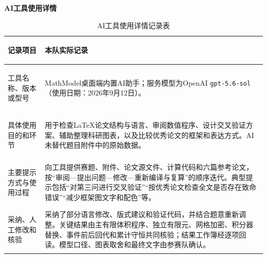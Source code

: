 \documentclass[12pt,a4paper]{ctexart}
\begin{document}
\begin{center}
	{\bfseries AI工具使用详情}
\end{center}

\begin{table}[htbp]
	\centering
	\caption{AI工具使用详情记录表}
	\begin{tabularx}{\textwidth}{>{\bfseries\raggedright\arraybackslash}p{3.6cm}>{\raggedright\arraybackslash}X}
		\toprule
		记录项目 & 本队实际记录 \\
		\midrule
		工具名称、版本或型号 & MathModel桌面端内置AI助手；服务模型为OpenAI \texttt{gpt-5.6-sol}（使用日期：2026年9月12日）。 \\
		具体使用目的和环节 & 用于检查LaTeX论文结构与语言、审阅数值程序、设计交叉验证方案、辅助整理科研图表，以及比较优秀论文的框架和表达方式。AI未替代题目附件中的原始数据。 \\
		主要提示方式与使用过程 & 向工具提供赛题、附件、论文源文件、计算代码和六篇参考论文，按“审阅---提出问题---修改---重新编译与复算”的顺序迭代。典型提示包括“对第三问进行交叉验证”“按优秀论文检查全文是否存在致命错误”“减少框架图文字和配色”等。 \\
		采纳、人工修改和核验 & 采纳了部分语言修改、版式建议和验证代码，并结合题意重新调整。关键结果由主有限体积程序、独立有限元、网格加密、积分器替换、事件前后回代和累计守恒共同核验；结果工作簿经逐项回读。模型口径、图表取舍和最终文字由参赛队确认。 \\
		\bottomrule
	\end{tabularx}
\end{table}

\end{document}
